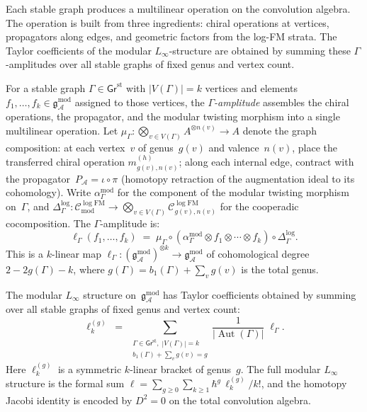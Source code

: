 \documentclass[11pt]{report}
\theoremstyle{definition}
\theoremstyle{remark}
\providecommand{\cA}{\mathcal{A}}
\providecommand{\cC}{\mathcal{C}}
\providecommand{\gAmod}{\mathfrak{g}^{\mathrm{mod}}_\cA}
\numberwithin{equation}{section}
\begin{document}
Each stable graph produces a multilinear operation on the convolution
algebra. The operation is built from three ingredients: chiral
operations at vertices, propagators along edges, and geometric
factors from the log-FM strata. The Taylor coefficients of the
modular $L_\infty$-structure are obtained by summing these
$\Gamma$-amplitudes over all stable graphs of fixed genus and
vertex count.

For a stable graph $\Gamma\in\mathsf{Gr}^{\mathrm{st}}$ with
$|V(\Gamma)|=k$ vertices and elements $f_1,\dots,f_k\in\gAmod$
assigned to those vertices, the \emph{$\Gamma$-amplitude} assembles
the chiral operations, the propagator, and the modular twisting
morphism into a single multilinear operation. Let
$\mu_\Gamma\colon\bigotimes_{v\in V(\Gamma)}A^{\otimes n(v)}\to A$
denote the graph composition: at each vertex~$v$ of genus~$g(v)$ and
valence~$n(v)$, place the transferred chiral operation
$m^{(h)}_{g(v),n(v)}$; along each internal edge, contract with the
propagator~$P_\cA=\iota\circ\pi$ (homotopy retraction of the
augmentation ideal to its cohomology). Write
$\alpha^{\mathrm{mod}}_\Gamma$ for the component of the modular
twisting morphism on~$\Gamma$, and
$\Delta^{\log}_\Gamma\colon\cC^{\log\mathrm{FM}}_{\mathrm{mod}}
\to\bigotimes_{v\in V(\Gamma)}\cC^{\log\mathrm{FM}}_{g(v),n(v)}$
for the cooperadic cocomposition. The $\Gamma$-amplitude is:
\[
\ell_\Gamma(f_1,\dots,f_k)
\;=\;
\mu_\Gamma\circ
(\alpha^{\mathrm{mod}}_\Gamma\otimes f_1\otimes\cdots\otimes f_k)
\circ\Delta^{\log}_\Gamma.
\]
This is a $k$-linear map
$\ell_\Gamma\colon(\gAmod)^{\otimes k}\to\gAmod$ of cohomological
degree $2-2g(\Gamma)-k$, where $g(\Gamma)=b_1(\Gamma)+\sum_v g(v)$
is the total genus.

The modular $L_\infty$ structure on~$\gAmod$ has Taylor coefficients
obtained by summing over all stable graphs of fixed genus and vertex
count:
\[
\ell_k^{(g)}
\;=\;
\sum_{\substack{
\Gamma\in\mathsf{Gr}^{\mathrm{st}},\;|V(\Gamma)|=k\\
b_1(\Gamma)+\sum_v g(v)=g}}
\frac{1}{|\operatorname{Aut}(\Gamma)|}\;\ell_\Gamma.
\]
Here $\ell_k^{(g)}$ is a symmetric $k$-linear bracket of genus~$g$.
The full modular $L_\infty$ structure is the formal sum
$\ell=\sum_{g\ge 0}\sum_{k\ge 1}\hbar^g\,\ell_k^{(g)}/k!$, and the
homotopy Jacobi identity is encoded by $D^2=0$ on the total
convolution algebra.

\medskip
\end{document}
